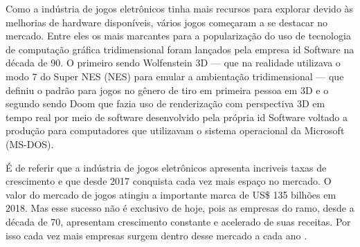 Como a indústria de jogos eletrônicos tinha mais recursos para explorar devido às melhorias de hardware disponíveis, vários jogos começaram a se destacar no mercado. Entre eles os mais marcantes para a popularização do uso de tecnologia de computação gráfica tridimensional foram lançados pela empresa id Software na década de 90. O primeiro sendo Wolfenstein 3D --- que na realidade utilizava o modo 7 do Super NES (\acrlong{NES}) para emular a ambientação tridimensional --- que definiu o padrão para jogos no gênero de tiro em primeira pessoa em 3D e o segundo sendo Doom que fazia uso de renderização com perspectiva 3D em tempo real por meio de software desenvolvido pela própria id Software voltado a produção para computadores que utilizavam o sistema operacional da Microsoft (\acrshort{MS-DOS}).

    \begin{figure}[h!]
		\centering
	\end{figure}
	\nocite{figura3}

É de referir que a indústria de jogos eletrônicos apresenta incriveis taxas de crescimento e que desde 2017 conquista cada vez mais espaço no mercado. O valor do mercado de jogos atingiu a importante marca de US\$ 135 bilhões em 2018. Mas esse sucesso não é exclusivo de hoje, pois as empresas do ramo, desde a década de 70, apresentam crescimento constante e acelerado de suas receitas. Por isso cada vez mais empresas surgem dentro desse mercado a cada ano \cite{comparacaoDesempenho2}. 
	
